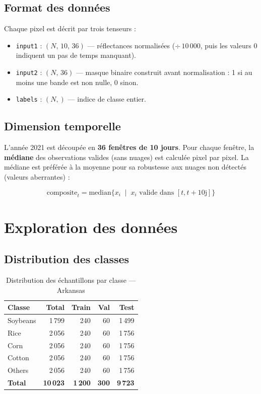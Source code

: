 \subsection{Format des données}

Chaque pixel est décrit par trois tenseurs :

\begin{itemize}
  \item \texttt{input1} : $(N,\,10,\,36)$ — réflectances normalisées
        ($\div\,10\,000$, puis les valeurs 0 indiquent un pas de temps manquant).
  \item \texttt{input2} : $(N,\,36)$ — masque binaire construit avant
        normalisation : 1 si au moins une bande est non nulle, 0 sinon.
  \item \texttt{labels} : $(N,)$ — indice de classe entier.
\end{itemize}


\subsection{Dimension temporelle}

L'année 2021 est découpée en \textbf{36 fenêtres de 10 jours}. Pour
chaque fenêtre, la \textbf{médiane} des observations valides (sans nuages)
est calculée pixel par pixel. La médiane est préférée à la moyenne pour
sa robustesse aux nuages non détectés (valeurs aberrantes) :

\begin{equation}
  \text{composite}_t = \text{median}\!\big\{x_i \;\mid\; x_i \text{ valide dans } [t, t+10\text{j}]\big\}
\end{equation}

\section{Exploration des données}
\label{sec:exploration}

\subsection{Distribution des classes}

\begin{table}[H]
\centering
\caption{Distribution des échantillons par classe — Arkansas}
\label{tab:dist_ark}
\begin{tabular}{lrrrr}
\toprule
\textbf{Classe} & \textbf{Total} & \textbf{Train} & \textbf{Val} & \textbf{Test} \\
\midrule
Soybeans & 1\,799 & 240 & 60 & 1\,499 \\
Rice     & 2\,056 & 240 & 60 & 1\,756 \\
Corn     & 2\,056 & 240 & 60 & 1\,756 \\
Cotton   &   2\,056  & 240 & 60 &   1\,756  \\
Others   &   2\,056  & 240 & 60 &   1\,756  \\
\midrule
\textbf{Total} & \textbf{10\,023} & \textbf{1\,200} & \textbf{300} & \textbf{9\,723} \\
\bottomrule
\end{tabular}
\end{table}


